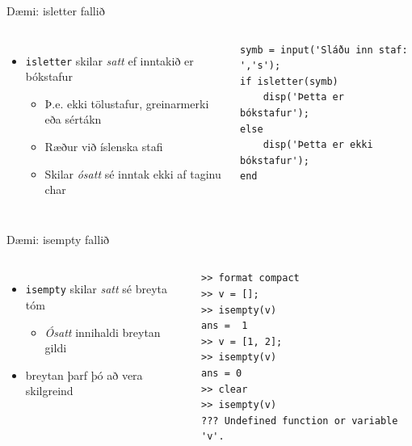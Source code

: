 \documentclass{beamer}
\begin{document}
\begin{frame}[fragile]{Dæmi: isletter fallið}
\begin{columns}
\begin{itemize}
 \item \texttt{isletter} skilar \emph{satt} ef inntakið er bókstafur
 \begin{itemize}
  \item Þ.e. ekki tölustafur, greinarmerki eða sértákn
  \item Ræður við íslenska stafi
  \item Skilar \emph{ósatt} sé inntak ekki af taginu char
 \end{itemize}
\end{itemize}
\begin{verbatim}
symb = input('Sláðu inn staf: ','s');
if isletter(symb)
    disp('Þetta er bókstafur');
else
    disp('Þetta er ekki bókstafur');
end
\end{verbatim}
\end{columns}
\end{frame}

\begin{frame}[fragile]{Dæmi: isempty fallið}
\begin{columns}
\begin{itemize}
 \item \texttt{isempty} skilar \emph{satt} sé breyta tóm
 \begin{itemize}
  \item \emph{Ósatt} innihaldi breytan gildi
 \end{itemize}
 \item breytan þarf þó að vera skilgreind
\end{itemize}
\begin{verbatim}
>> format compact
>> v = [];
>> isempty(v)
ans =  1
>> v = [1, 2];
>> isempty(v)
ans = 0
>> clear
>> isempty(v)
??? Undefined function or variable 'v'.
\end{verbatim}
\end{columns}
\end{frame}
\end{document}
